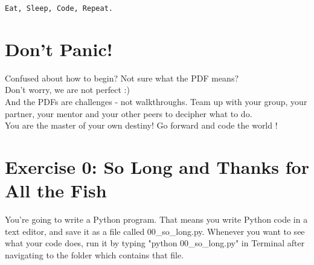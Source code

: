 \documentclass{42-en}
\begin{document}
\centerline{\texttt{Eat, Sleep, Code, Repeat.}}


\chapter{Don't Panic!}

Confused about how to begin? Not sure what the PDF means?\\

Don't worry, we are not perfect :)\\

And the PDFs are challenges - not walkthroughs. Team up with your group, your partner,
your mentor and your other peers to decipher what to do.\\

You are the master of your own destiny! Go forward and code the world !


\startexercices


\chapter{Exercise 0: So Long and Thanks for All the Fish}
\makeheaderfiles

You're going to write a Python program. That means you write Python code in a text editor, and save it as a file called 00\_so\_long.py. Whenever you want to see what your code does, run it by typing "python 00\_so\_long.py" in Terminal after navigating to the folder which contains that file.\\
\end{document}
